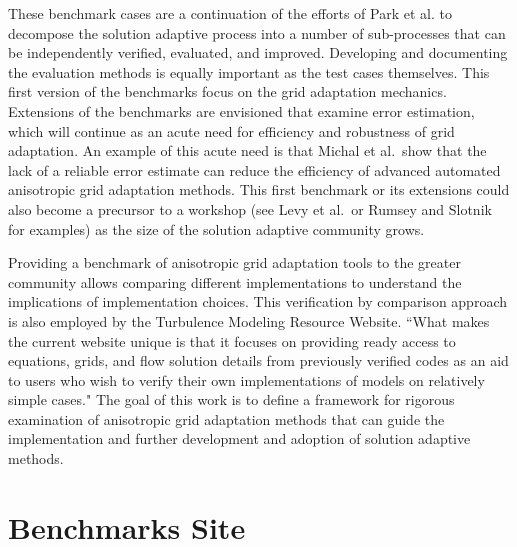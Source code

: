 \documentclass[3p,times,procedia,number]{elsarticle}
\begin{document}
These benchmark cases are a continuation of the efforts of
Park et al.\cite{park-loseille-krakos-michal-adapt-decomposition}
to decompose the solution adaptive process into a number of
sub-processes that can be independently verified, evaluated, and improved.
Developing and documenting the evaluation methods is equally important
as the test cases themselves.
This first version of the benchmarks focus on the grid adaptation
mechanics.
Extensions of the benchmarks are envisioned that examine error
estimation, which will continue as an acute need for
efficiency and robustness of grid adaptation.
An example of this acute need is that
Michal et al.\cite{michal-unstruct-adapt-epic-dpw6}~show that
the lack of a reliable error estimate can reduce the efficiency of advanced
automated anisotropic grid adaptation methods.
This first benchmark or its extensions could also become a
precursor to a workshop (see Levy et al.\cite{dpw5-summary}~or
Rumsey and Slotnik\cite{rumsey-slotnick-summary-highliftpw2} for examples)
as the size of the solution adaptive community grows.

Providing a benchmark
of anisotropic grid adaptation tools
to the greater community
allows comparing different implementations
to understand the implications of implementation choices.
This verification by comparison approach is also employed by the
Turbulence Modeling Resource Website.\cite{rumsey-smith-huang-turbmodels-description}
``What makes the current website unique is that it focuses on
providing ready access to equations, grids, and flow solution details
from previously verified codes as an aid to users
who wish to verify their own implementations of models on
relatively simple cases."\cite{rumsey-smith-huang-turbmodels-description}
The goal of this work is to define a framework for
rigorous examination of anisotropic grid adaptation methods
that can guide the implementation and
further development and adoption of solution adaptive methods.

\section{Benchmarks Site}
\end{document}
